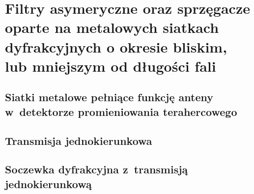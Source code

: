 \chapter{Filtry asymeryczne oraz sprzęgacze oparte na metalowych siatkach dyfrakcyjnych o okresie bliskim, lub mniejszym od długości fali}
\label{chap:thz}


\section{Siatki metalowe pełniące funkcję anteny w~detektorze promieniowania terahercowego}


\section{Transmisja jednokierunkowa}

\section{Soczewka dyfrakcyjna z~transmisją jednokierunkową}

